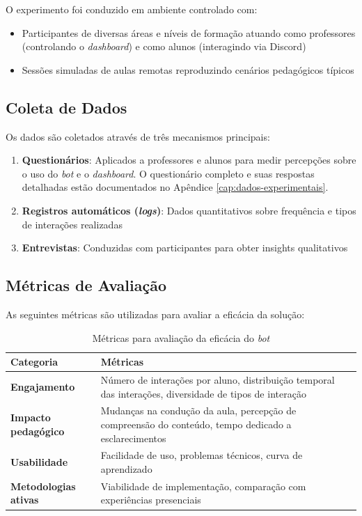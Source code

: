 O experimento foi conduzido em ambiente controlado com:

\begin{itemize}
\item Participantes de diversas áreas e níveis de formação atuando como
professores (controlando o \textit{dashboard}) e como alunos (interagindo via
Discord)
\item Sessões simuladas de aulas remotas reproduzindo cenários pedagógicos
típicos
\end{itemize}

\subsection{Coleta de Dados}
\label{subsec:coleta}

Os dados são coletados através de três mecanismos principais:

\begin{enumerate}
\item \textbf{Questionários}: Aplicados a professores e alunos para medir
percepções sobre o uso do \textit{bot} e o \textit{dashboard}. O questionário
completo e suas respostas detalhadas estão documentados no Apêndice
\ref{cap:dados-experimentais}.
\item \textbf{Registros automáticos (\textit{logs})}: Dados quantitativos sobre
frequência e tipos de interações realizadas
\item \textbf{Entrevistas}: Conduzidas com participantes para obter insights
qualitativos
\end{enumerate}

\subsection{Métricas de Avaliação}
\label{subsec:metricas}

As seguintes métricas são utilizadas para avaliar a eficácia da solução:

\begin{table}[htb]
\centering
\caption{Métricas para avaliação da eficácia do \textit{bot}}
\label{tab:metricas}
\begin{tabular}{|p{3cm}|p{9cm}|}
\hline
\textbf{Categoria} & \textbf{Métricas} \\
\hline
\textbf{Engajamento} & Número de interações por aluno, distribuição temporal das
interações, diversidade de tipos de interação \\
\hline
\textbf{Impacto pedagógico} & Mudanças na condução da aula, percepção de
compreensão do conteúdo, tempo dedicado a esclarecimentos \\
\hline
\textbf{Usabilidade} & Facilidade de uso, problemas técnicos, curva de
aprendizado \\
\hline
\textbf{Metodologias ativas} & Viabilidade de implementação, comparação com
experiências presenciais \\
\hline
\end{tabular}
\end{table}

